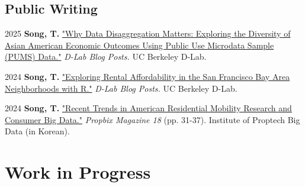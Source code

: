 \documentclass[12pt,letterpaper]{report}
\newcommand{\listitemspace}{0.4em}
\renewenvironment{itemize}
{\begin{list}{}{\setlength{\leftmargin}{0.5em}
                \setlength{\parskip}{0em}
                \setlength{\itemsep}{\listitemspace}
                \setlength{\parsep}{\listitemspace}}}
{\end{list}}
\begin{document}
    \subsection*{Public Writing}
    \begin{tablist}
    \item[2025] \tab{}\textbf{Song, T.} \href{https://medium.com/@dlab-berkeley/why-data-disaggregation-matters-exploring-the-diversity-of-asian-american-economic-outcomes-using-8b96e5dcc9a4}{"Why Data Disaggregation Matters: Exploring the Diversity of Asian American Economic Outcomes Using Public Use Microdata Sample (PUMS) Data."} \emph{D-Lab Blog Posts.} UC Berkeley D-Lab.
    \item[2024] \tab{}\textbf{Song, T.} \href{https://medium.com/@dlab-berkeley/exploring-rental-affordability-in-the-san-francisco-bay-area-neighborhoods-with-r-c4383f7553e7}{"Exploring Rental Affordability in the San Francisco Bay Area Neighborhoods with R."} \emph{D-Lab Blog Posts.} UC Berkeley D-Lab.
    \item[2024] \tab{}\textbf{Song, T.} \href{https://www.kahps.org/data/prbx/pdf_44_7}{"Recent Trends in American Residential Mobility Research and Consumer Big Data."} \emph{Propbix Magazine 18} (pp. 31-37). Institute of Proptech Big Data (in Korean).
    \end{tablist}

\section*{Work in Progress}
\end{document}
